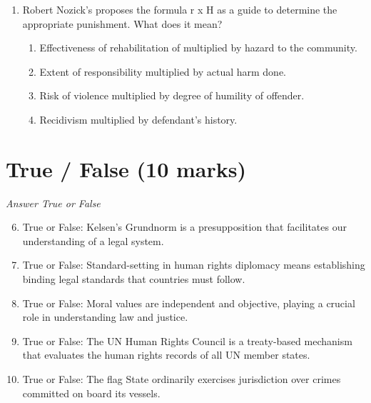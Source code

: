 \documentclass[12pt]{article}
\begin{document}
\begin{enumerate}[label=\arabic*.]
\begin{enumerate}[label=(\alph*)]
    \item Law is like language.
    \item Law is the deliberate expression of a sovereign's will.
    \item Law is an integral element of the social fabric.
\end{enumerate}
\item Robert Nozick's proposes the formula r x H as a guide to determine the appropriate punishment. What does it mean?
\begin{enumerate}[label=(\alph*)]
    \item Effectiveness of rehabilitation of multiplied by hazard to the community.
    \item Extent of responsibility multiplied by actual harm done.
    \item Risk of violence multiplied by degree of humility of offender.
    \item Recidivism multiplied by defendant's history.
\end{enumerate}
\end{enumerate}

\section*{True / False (10 marks)}
\textit{Answer True or False}
\begin{enumerate}[label=\arabic*.]
\setcounter{enumi}{5}
\item True or False: Kelsen's Grundnorm is a presupposition that facilitates our understanding of a legal system.
\item True or False: Standard-setting in human rights diplomacy means establishing binding legal standards that countries must follow.
\item True or False: Moral values are independent and objective, playing a crucial role in understanding law and justice.
\item True or False: The UN Human Rights Council is a treaty-based mechanism that evaluates the human rights records of all UN member states.
\item True or False: The flag State ordinarily exercises jurisdiction over crimes committed on board its vessels.
\end{enumerate}
\end{document}
